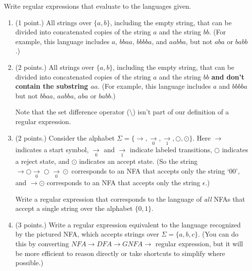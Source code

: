 \documentclass{../homework}
\begin{document}
Write regular expressions that evaluate to the languages given.
\begin{enumerate}[resume]
    \item (1 point.) All strings over $\{a, b\}$, including the empty string, that can be divided into concatenated copies of the string $a$ and the string $bb$. (For example, this language includes $a$, $bbaa$, $bbbba$, and $aabba$, but not $aba$ or $babb$.)
    
    \item (2 points.) All strings over $\{a, b\}$, including the empty string, that can be divided into concatenated copies of the string $a$ and the string $bb$ \textbf{and don't contain the substring $aa$}. (For example, this language includes $a$ and $bbbba$ but not $bbaa$, $aabba$, $aba$ or $babb$.)
    
    Note that the set difference operator ($\setminus$) isn't part of our definition of a regular expression.

    \item (2 points.) Consider the alphabet $\Sigma = \{\rightarrow, \underset{0}{\rightarrow}, \underset{1}{\rightarrow}, \bigcirc, \odot\}$. Here $\rightarrow$ indicates a start symbol, $\underset{0}{\rightarrow}$ and $\underset{1}{\rightarrow}$ indicate labeled transitions, $\bigcirc$ indicates a reject state, and $\odot$ indicates an accept state. (So the string $\rightarrow \bigcirc \underset{0}{\rightarrow} \bigcirc \underset{0}{\rightarrow} \odot$ corresponds to an NFA that accepts only the string `00', and $\rightarrow \odot$ corresponds to an NFA that accepts only the string $\epsilon$.)
    
    Write a regular expression that corresponds to the language of \emph{all} NFAs that accept a single string over the alphabet $\{0, 1\}$.
    
    \item (3 points.) Write a regular expression equivalent to the language recognized by the pictured NFA, which accepts strings over $\Sigma = \{a, b, c\}$. (You can do this by converting $NFA \rightarrow DFA \rightarrow GNFA \rightarrow $ regular expression, but it will be more efficient to reason directly or take shortcuts to simplify where possible.)
    

\end{enumerate}
\end{document}
